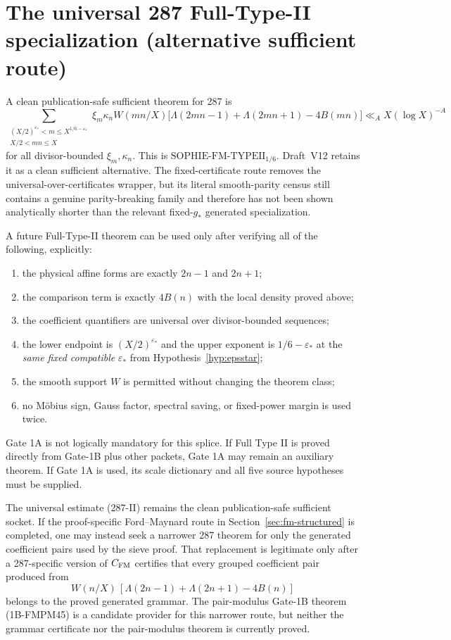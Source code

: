 \documentclass[11pt]{article}
\theoremstyle{definition}
\theoremstyle{remark}
\newcommand{\SophieTI}{\mathrm{SOPHIE\mbox{-}FM\mbox{-}TYPEII}_{1/6}}
\newcommand{\1}{\mathbf 1}
\begin{document}
\section{The universal 287 Full-Type-II specialization (alternative sufficient route)}

A clean publication-safe sufficient theorem for 287 is
\[
 \boxed{
 \sum_{\substack{(X/2)^{\varepsilon_*}<m\le X^{1/6-\varepsilon_*}\\X/2<mn\le X}}
 \xi_m\kappa_n W(mn/X)
 \bigl[\Lambda(2mn-1)+\Lambda(2mn+1)-4B(mn)\bigr]
 \ll_A X(\log X)^{-A}}
\tag{287-II}
\]
for all divisor-bounded $\xi_m,\kappa_n$.  This is $\SophieTI$.  Draft~V12 retains it as a clean sufficient alternative.  The fixed-certificate route
removes the universal-over-certificates wrapper, but its literal smooth-parity census still contains a genuine
parity-breaking family and therefore has not been shown analytically shorter than the relevant fixed-$g_*$
generated specialization.

A future Full-Type-II theorem can be used only after verifying all of the following, explicitly:
\begin{enumerate}
\item the physical affine forms are exactly $2n-1$ and $2n+1$;
\item the comparison term is exactly $4B(n)$ with the local density proved above;
\item the coefficient quantifiers are universal over divisor-bounded sequences;
\item the lower endpoint is $(X/2)^{\varepsilon_*}$ and the upper exponent is $1/6-\varepsilon_*$ at the \emph{same fixed compatible} $\varepsilon_*$ from Hypothesis~\ref{hyp:epsstar};
\item the smooth support $W$ is permitted without changing the theorem class;
\item no M\"obius sign, Gauss factor, spectral saving, or fixed-power margin is used twice.
\end{enumerate}

Gate 1A is not logically mandatory for this splice.  If Full Type II is proved directly from Gate-1B plus other
packets, Gate 1A may remain an auxiliary theorem.  If Gate 1A is used, its scale dictionary and all five source
hypotheses must be supplied.


The universal estimate (287-II) remains the clean publication-safe sufficient socket.  If the proof-specific
Ford--Maynard route in Section~\ref{sec:fm-structured} is completed, one may instead seek a narrower 287 theorem
for only the generated coefficient pairs used by the sieve proof.  That replacement is legitimate only after a
287-specific version of $C_{\rm FM}$ certifies that every grouped coefficient pair produced from
\[
 W(n/X)\,[\Lambda(2n-1)+\Lambda(2n+1)-4B(n)]
\]
belongs to the proved generated grammar.  The pair-modulus Gate-1B theorem (1B-FMPM45) is a candidate provider
for this narrower route, but neither the grammar certificate nor the pair-modulus theorem is currently proved.
\end{document}
